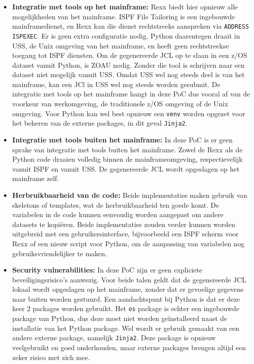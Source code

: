 \begin{itemize}
\item \textbf{Integratie met tools op het mainframe:}
Rexx biedt hier opnieuw alle mogelijkheden van het mainframe. ISPF File Tailoring is een ingebouwde mainframedienst, en Rexx kan die dienst rechtstreeks aanspreken via \texttt{ADDRESS ISPEXEC}. Er is geen extra configuratie nodig. Python daarentegen draait in USS, de Unix omgeving van het mainframe, en heeft geen rechtstreekse toegang tot ISPF diensten. Om de gegenereerde JCL op te slaan in een z/OS dataset vanuit Python, is ZOAU nodig. Zonder die tool is schrijven naar een dataset niet mogelijk vanuit USS. Omdat USS wel nog steeds deel is van het mainframe, kan een JCl in USS wel nog steeds worden gesubmit. De integratie met tools op het mainframe hangt in deze PoC dus vooral af van de voorkeur van werkomgeving, de traditionele z/OS omgeving of de Unix omgeving. Voor Python kan wel best opnieuw een \texttt{venv} worden opgezet voor het beheren van de externe packages, in dit geval \texttt{Jinja2}.
    
\item \textbf{Integratie met tools buiten het mainframe:}
In deze PoC is er geen sprake van integratie met tools buiten het mainframe. Zowel de Rexx als de Python code draaien volledig binnen de mainframeomgeving, respectievelijk vanuit ISPF en vanuit USS. De gegenereerde JCL wordt opgeslagen op het mainframe zelf.
    
\item \textbf{Herbruikbaarheid van de code:}
Beide implementaties maken gebruik van skeletons of templates, wat de herbruikbaarheid ten goede komt. De variabelen in de code kunnen eenvoudig worden aangepast om andere datasets te kopiëren. Beide implementaties zouden verder kunnen worden uitgebreid met een gebruikersinterface, bijvoorbeeld een ISPF scherm voor Rexx of een nieuw script voor Python, om de aanpassing van variabelen nog gebruiksvriendelijker te maken.
    
\item \textbf{Security vulnerabilities:}
In deze PoC zijn er geen expliciete beveiligingsrisico's aanwezig. Voor beide talen geldt dat de gegenereerde JCL lokaal wordt opgeslagen op het mainframe, zonder dat er gevoelige gegevens naar buiten worden gestuurd. Een aandachtspunt bij Python is dat er deze keer 2 packages worden gebruikt. Het \texttt{os} package is echter een ingebouwde package van Python, dus deze moet niet worden geïnstalleerd naast de installatie van het Python package. Wel wordt er gebruik gemaakt van een andere externe package, namelijk \texttt{Jinja2}. Deze package is opnieuw veelgebruikt en goed onderhouden, maar externe packages brengen altijd een zeker risico met zich mee.
    

\end{itemize}

